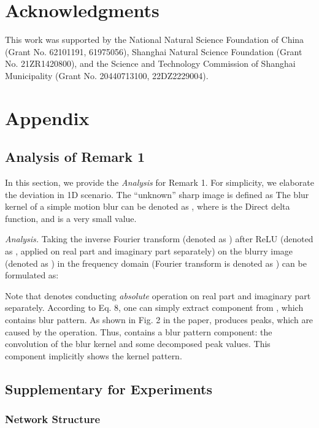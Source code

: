 \documentclass[letterpaper]{article} \usepackage{aaai23}  \usepackage{times}  \usepackage{helvet}  \usepackage{courier}  \usepackage[hyphens]{url}  \usepackage{graphicx} \usepackage{enumitem}
\begin{document}
\section{Acknowledgments}
This work was supported by the National Natural Science Foundation of China (Grant No. 62101191, 61975056), Shanghai Natural Science Foundation (Grant No. 21ZR1420800), and the Science and Technology Commission of Shanghai Municipality (Grant No. 20440713100, 22DZ2229004).




\clearpage

\appendix

\section{Appendix}

\subsection{Analysis of Remark 1}

In this section, we provide the \emph{Analysis} for Remark 1. For simplicity, we elaborate the deviation in 1D scenario. The ``unknown'' sharp image is defined as  The blur kernel of a simple motion blur can be denoted as , where  is the Direct delta function, and  is a very small value.

\emph{Analysis.} Taking the inverse Fourier transform (denoted as ) after ReLU (denoted as , applied on real part and imaginary part separately) on the blurry image (denoted as ) in the frequency domain (Fourier transform is denoted as ) can be formulated as:

Note that  denotes conducting \emph{absolute} operation on real part and imaginary part separately. According to Eq. 8, one can simply extract component  from , which contains blur pattern. As shown in Fig. 2 in the paper,  produces peaks, which are caused by the  operation. Thus,  contains a blur pattern component: the convolution of the blur kernel  and some decomposed peak values. This component implicitly shows the kernel pattern.

\subsection{Supplementary for Experiments}

\subsubsection{Network Structure}
\end{document}
